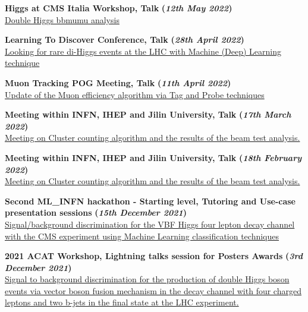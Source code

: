\documentclass[11pt]{res}
\begin{document}
\begin{resume}
\textbf{Higgs at CMS Italia Workshop, Talk} \textbf{(\textit{12th May 2022})}\\ 
\href{https://indico.cern.ch/event/1137095/}{Double Higgs bbmumu analysis}

\textbf{Learning To Discover Conference, Talk} \textbf{(\textit{28th April 2022})}\\ 
\href{https://indico.ijclab.in2p3.fr/event/5999/contributions/25075/}{Looking for rare di-Higgs events at the LHC with Machine (Deep) Learning technique}

\textbf{Muon Tracking POG Meeting, Talk} \textbf{(\textit{11th April 2022})}\\ 
\href{https://indico.cern.ch/event/1148914/?note=193823}{Update of the Muon efficiency algorithm via Tag and Probe techniques}

\textbf{Meeting within INFN, IHEP and Jilin University, Talk} \textbf{(\textit{17th March 2022})} \\
\href{https://indico.ihep.ac.cn/event/15780/other-view?view=standard}{Meeting on Cluster counting algorithm and the results of the beam test analysis.}
			
\textbf{Meeting within INFN, IHEP and Jilin University, Talk} \textbf{(\textit{18th February 2022})} \\
\href{https://indico.ihep.ac.cn/event/15780/other-view?view=standard}{Meeting on Cluster counting algorithm and the results of the beam test analysis.}
											
\textbf{Second ML\_INFN hackathon - Starting level, Tutoring and Use-case presentation sessions} \textbf{(\textit{15th December 2021})}\\ 
\href{https://agenda.infn.it/event/28565/contributions/148551/}{Signal/background discrimination for the VBF Higgs four lepton decay channel with the CMS experiment using Machine Learning classification techniques}

\textbf{2021 ACAT Workshop, Lightning talks session for Posters Awards} \textbf{(\textit{3rd December 2021})}\\ 
\href{https://indico.cern.ch/event/855454/contributions/4596351/}{Signal to background discrimination for the production of double Higgs boson events via vector boson fusion mechanism in the decay channel with four charged leptons and two b-jets in the final state at the LHC experiment.}



\end{resume}
\end{document}
